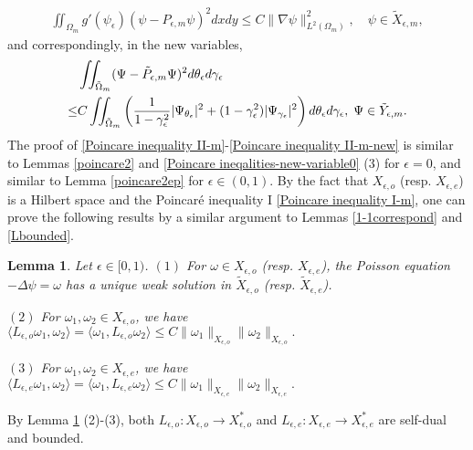 \documentclass[1 [leqno, 11pt]{amsart}
\numberwithin{equation}{section}
\let\ep=\epsilon
\newtheorem{lemma}[Theorem]{Lemma}
\begin{document}
\begin{CJK*}{GBK}{song}
\begin{align}
\iint_{\Omega_m} g'(\psi_\epsilon)(\psi - P_{\epsilon,m}\psi)^2 dxdy  \leq C \|\nabla \psi\|_{L^2(\Omega_m)}^2, \quad \psi \in \tilde{X}_{\ep,m},
\end{align}
and correspondingly, in the new variables,
\begin{align}\nonumber
&\iint_{\tilde \Omega_{m}} (\Psi -\tilde P_{\epsilon,m}\Psi)^2 d \theta_\ep d\gamma_\ep  \\\label{Poincare inequality II-m-new}
\leq& C \iint_{\tilde \Omega_{m}}\left({1\over1-\gamma_\ep^2}|\Psi_{\theta_\ep}|^2+(1-\gamma_\ep^2)|\Psi_{\gamma_\ep}|^2\right)d \theta_\ep d\gamma_\ep,\;\Psi \in \tilde{Y}_{\ep,m}.
\end{align}
The proof of \eqref{Poincare inequality II-m}-\eqref{Poincare inequality II-m-new} is similar to Lemmas \ref{poincare2} and \ref{Poincare ineqalities-new-variable0} (3) for $\ep=0$, and similar to Lemma \ref{poincare2ep} for $\ep\in(0,1)$.
By the fact that $X_{\ep,o}$ (resp.  $X_{\ep,e}$) is a Hilbert space and the Poincar\'e inequality I \eqref{Poincare inequality I-m}, one can prove the following results by a similar argument to Lemmas \ref{1-1correspond} and \ref{Lbounded}.

\begin{lemma}\label{1-1correspond-Lbounded-m} Let $\ep\in[0,1)$.
$(1)$ For $\omega \in X_{\ep,o}$ (resp.  $X_{\ep,e}$), the Poisson equation
$-\Delta\psi=\omega$
has a unique weak solution in $\tilde{X}_{\ep,o}$ (resp.  $\tilde X_{\ep,e}$).

$(2)$
For  $\omega_1,\omega_2 \in X_{\ep,o}$, we have
$\langle L_{\ep,o} \omega_1, \omega_2 \rangle=\langle \omega_1, L_{\ep,o} \omega_2 \rangle \leq C\|\omega_1\|_{X_{\ep,o}}\|\omega_2\|_{X_{\ep,o}}.$

$(3)$
For  $\omega_1,\omega_2 \in X_{\ep,e}$, we have
$\langle L_{\ep,e} \omega_1, \omega_2 \rangle=\langle \omega_1, L_{\ep,e} \omega_2 \rangle \leq C\|\omega_1\|_{X_{\ep,e}}\|\omega_2\|_{X_{\ep,e}}.$
\end{lemma}
By Lemma \ref{1-1correspond-Lbounded-m} (2)-(3), both $L_{\ep,o}:X_{\ep, o}\rightarrow X_{\ep, o}^*$ and $L_{\ep,e}:X_{\ep, e}\rightarrow X_{\ep, e}^*$ are self-dual and bounded.


\end{CJK*}
\end{document}
